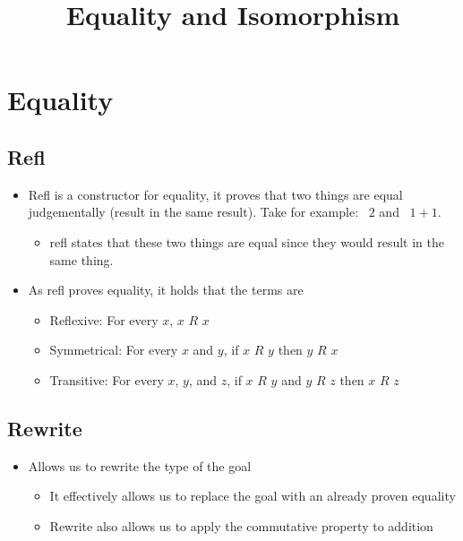 \documentclass{lecturenotes}
\title{Equality and Isomorphism}
\begin{document}
\maketitle
\section{Equality}
\label{sec:Equality}
\subsection*{Refl}
\begin{itemize}
    \item Refl is a constructor for equality, it proves that two things are equal judgementally
    (result in the same result).
    \newline Take for example: ~$2$ and ~$1 + 1$.
    \begin{itemize}
        \item refl states that these two things are equal since they would result in the same thing.
    \end{itemize}
    \item As refl proves equality, it holds that the terms are
    \begin{itemize}
        \item Reflexive: For every $x$, $x$ $R$ $x$
        \item Symmetrical: For every $x$ and $y$, if $x$ $R$ $y$ then $y$ $R$ $x$
        \item Transitive: For every $x$, $y$, and $z$, if $x$ $R$ $y$ and $y$ $R$ $z$ then $x$ $R$ $z$
    \end{itemize}
  \end{itemize}
\subsection*{Rewrite}
\begin{itemize}
    \item Allows us to rewrite the type of the goal 
    \begin{itemize}
        \item It effectively allows us to replace the goal with an already proven equality
        \item Rewrite also allows us to apply the commutative property to addition
    \end{itemize}
\end{itemize}
\end{document}
